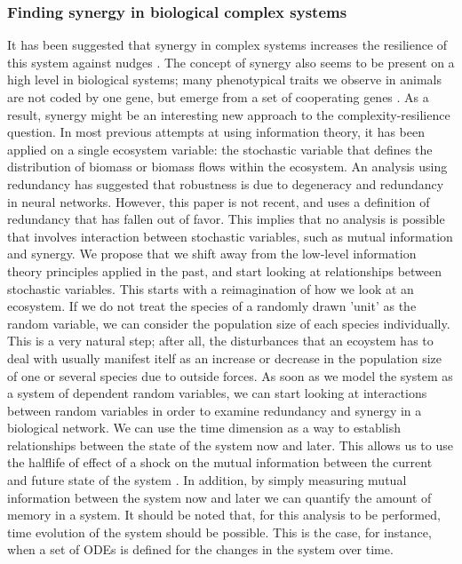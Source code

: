 \documentclass[../main.tex]{subfiles}
\begin{document}
\subsubsection{Finding synergy in biological complex systems}

It has been suggested that synergy in complex systems increases the resilience of this system against nudges \cite{quax2017quantifying}.
The concept of synergy also seems to be present on a high level in biological systems; many phenotypical traits we observe in animals are not coded by one gene, but emerge from a set of cooperating genes \cite{griffith2014quantifying}.
As a result, synergy might be an interesting new approach to the complexity-resilience question.
In most previous attempts at using information theory, it has been applied on a single ecosystem variable: the stochastic variable that defines the distribution of biomass or biomass flows within the ecosystem.
An analysis using redundancy has suggested that robustness is due to degeneracy and redundancy in neural networks.
However, this paper is not recent, and uses a definition of redundancy that has fallen out of favor.
This implies that no analysis is possible that involves interaction between stochastic variables, such as mutual information and synergy.
We propose that we shift away from the low-level information theory principles applied in the past, and start looking at relationships between stochastic variables.
This starts with a reimagination of how we look at an ecosystem.
If we do not treat the species of a randomly drawn 'unit' as the random variable, we can consider the population size of each species individually.
This is a very natural step; after all, the disturbances that an ecoystem has to deal with usually manifest itelf as an increase or decrease in the population size of one or several species due to outside forces.
As soon as we model the system as a system of dependent random variables, we can start looking at interactions between random variables in order to examine redundancy and synergy in a biological network.
We can use the time dimension as a way to establish relationships between the state of the system now and later.
This allows us to use the halflife of effect of a shock on the mutual information between the current and future state of the system \cite{QuaxPersonal}.
In addition, by simply measuring mutual information between the system now and later we can quantify the amount of memory in a system.
It should be noted that, for this analysis to be performed, time evolution of the system should be possible.
This is the case, for instance, when a set of ODEs is defined for the changes in the system over time.
\end{document}
